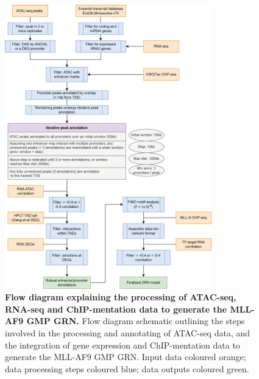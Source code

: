 \begin{figure}[p]
    \centering
    \includegraphics[width=0.8\textwidth,height=\textheight,keepaspectratio]{figures/appendix/app_methocult-workflow.png}
    \caption[{Flow diagram explaining the processing of ATAC-seq, RNA-seq and ChIP-mentation data to generate the MLL-AF9 GMP GRN.}]
    {\textbf{Flow diagram explaining the processing of ATAC-seq, RNA-seq and ChIP-mentation data to generate the MLL-AF9 GMP GRN.} 
    Flow diagram schematic outlining the steps involved in the processing and annotating of ATAC-seq data, and the integration of gene expression and ChIP-mentation data to generate the MLL-AF9 GMP GRN. Input data coloured orange; data processing steps coloured blue; data outputs coloured green.
    }
    \label{fig:app_methocult-workflow}
\end{figure}
\clearpage




